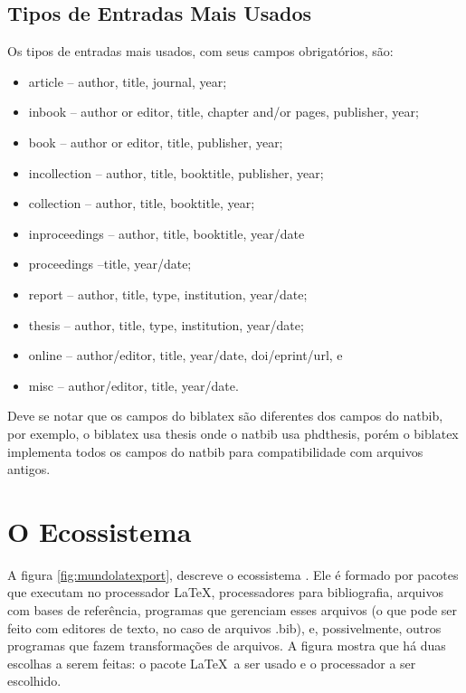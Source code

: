 
\subsection{Tipos de Entradas Mais Usados}

Os tipos de entradas mais usados, com seus campos obrigatórios, são\parencite{Kime:2019}:
\begin{itemize}
    \item article -- author, title, journal, year;
    \item inbook -- author or editor, title, chapter and/or pages, publisher, year;
    \item book -- author or editor, title, publisher, year;
    \item incollection -- author, title, booktitle, publisher, year;
    \item collection -- author, title, booktitle, year;
    \item inproceedings -- author, title, booktitle, year/date
    \item proceedings --title, year/date;
    \item report -- author, title, type, institution, year/date;
    \item thesis --  author, title, type, institution, year/date;
    \item online -- author/editor, title, year/date, doi/eprint/url, e
    \item misc -- author/editor, title, year/date.
\end{itemize}

Deve se notar que os campos do biblatex são diferentes dos campos do natbib, por exemplo, o biblatex usa thesis onde o natbib usa phdthesis, porém o biblatex implementa todos os campos do natbib para compatibilidade com
arquivos antigos.



\section{O Ecossistema }


A figura \ref{fig:mundolatexport}\autocite{bibera2012}, descreve o ecossistema . Ele é formado por pacotes que executam no processador \LaTeX , processadores para bibliografia, arquivos com bases de referência, programas que gerenciam esses arquivos (o que pode ser feito com editores de texto, no caso de arquivos .bib), e, possivelmente, outros programas que fazem transformações de arquivos. A figura mostra que há duas escolhas a serem feitas: o pacote \LaTeX\  a ser usado e o processador
a ser escolhido. 

